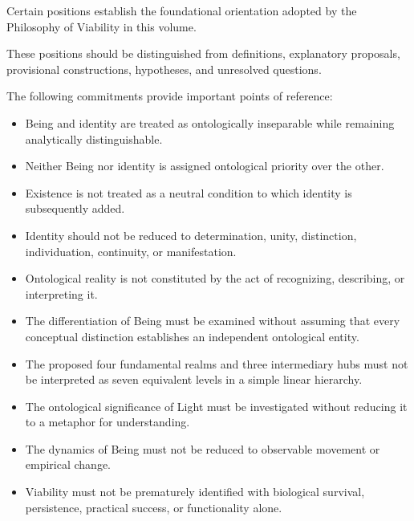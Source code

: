 Certain positions establish the foundational
orientation adopted by the Philosophy of Viability
in this volume.

These positions should be distinguished from
definitions, explanatory proposals, provisional
constructions, hypotheses, and unresolved questions.

The following commitments provide important
points of reference:

\begin{itemize}

    \item Being and identity are treated as
    ontologically inseparable while remaining
    analytically distinguishable.

    \item Neither Being nor identity is assigned
    ontological priority over the other.

    \item Existence is not treated as a neutral
    condition to which identity is subsequently
    added.

    \item Identity should not be reduced to
    determination, unity, distinction,
    individuation, continuity, or manifestation.

    \item Ontological reality is not constituted
    by the act of recognizing, describing,
    or interpreting it.

    \item The differentiation of Being must
    be examined without assuming that every
    conceptual distinction establishes an
    independent ontological entity.

    \item The proposed four fundamental realms
    and three intermediary hubs must not
    be interpreted as seven equivalent levels
    in a simple linear hierarchy.

    \item The ontological significance of Light
    must be investigated without reducing
    it to a metaphor for understanding.

    \item The dynamics of Being must not be
    reduced to observable movement or
    empirical change.

    \item Viability must not be prematurely
    identified with biological survival,
    persistence, practical success, or
    functionality alone.

\end{itemize}

